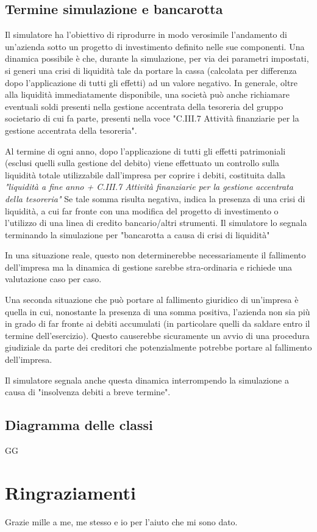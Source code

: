 \documentclass{article}
\begin{document}
\subsection{Termine simulazione e bancarotta}
Il simulatore ha l'obiettivo di riprodurre in modo verosimile l'andamento di un'azienda sotto un progetto di investimento definito nelle sue componenti. Una dinamica possibile è che, durante la simulazione, per via dei parametri impostati, si generi una crisi di liquidità tale da portare la cassa (calcolata per differenza dopo l'applicazione di tutti gli effetti) ad un valore negativo. 
In generale, oltre alla liquidità immediatamente disponibile, una società può anche richiamare eventuali soldi presenti nella gestione accentrata della tesoreria del gruppo societario di cui fa parte, presenti nella voce "C.III.7 Attività finanziarie per la gestione accentrata della tesoreria". 

Al termine di ogni anno, dopo l'applicazione di tutti gli effetti patrimoniali (esclusi quelli sulla gestione del debito) viene effettuato un controllo sulla liquidità totale utilizzabile dall'impresa per coprire i debiti, costituita dalla \textit{"liquidità a fine anno + C.III.7 Attività finanziarie per la gestione accentrata della tesoreria"}
Se tale somma risulta negativa, indica la presenza di una crisi di liquidità, a cui far fronte con una modifica del progetto di investimento o l'utilizzo di una linea di credito bancario/altri strumenti. 
Il simulatore lo segnala terminando la simulazione per "bancarotta a causa di crisi di liquidità"

 In una situazione reale, questo non determinerebbe necessariamente il fallimento dell'impresa ma la dinamica di gestione sarebbe stra-ordinaria e richiede una valutazione caso per caso. 

Una seconda situazione che può portare al fallimento giuridico di un'impresa è quella in cui, nonostante la presenza di una somma positiva, l'azienda non sia più in grado di far fronte ai debiti accumulati (in particolare quelli da saldare entro il termine dell'esercizio). Questo causerebbe sicuramente un avvio di una procedura giudiziale da parte dei creditori che potenzialmente potrebbe portare al fallimento dell'impresa. 

Il simulatore segnala anche questa dinamica interrompendo la simulazione a causa di "insolvenza debiti a breve termine". 

\subsection{Diagramma delle classi}
GG




\section{Ringraziamenti}
Grazie mille a me, me stesso e io per l'aiuto che mi sono dato. 
\end{document}
